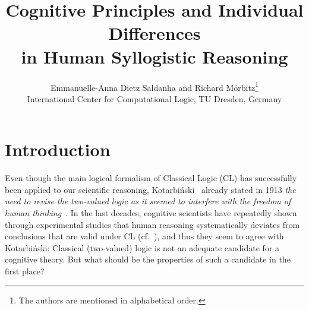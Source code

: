 \documentclass[12pt]{article}
\title{Cognitive Principles and Individual Differences \\ in Human Syllogistic Reasoning}
\author{
Emmanuelle-Anna Dietz Saldanha and Richard M{\"o}rbitz\thanks{The authors are mentioned in alphabetical order.} \\
\normalsize International Center for Computational Logic, TU
  Dresden, Germany
}
\date{}
\begin{document}
\maketitle

\section{Introduction}
% 
% 

Even though the main logical formalism of Classical Logic (CL) has successfully been applied to our scientific reasoning, Kotarbi{\'n}ski~\cite{kotarbinski:1913} already stated in 1913 \textit{the need to revise the two-valued logic as it seemed to interfere with the freedom of human thinking}~\cite[p.17]{malinowski:1993}.
In the last decades, cognitive scientists have repeatedly
shown through experimental studies that human reasoning systematically deviates from conclusions that are valid under CL (cf.~\cite{wason:68,byrne:89}),
and thus they seem to agree with Kotarbi{\'n}ski: Classical (two-valued) logic is not an adequate candidate for a cognitive theory.
 But what should be the properties of such a candidate in the first place?
\end{document}
